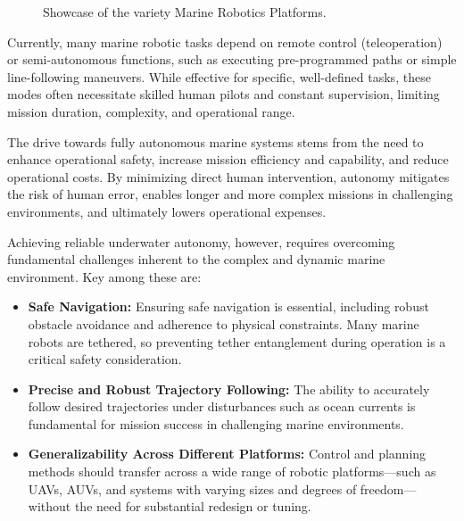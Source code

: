 \begin{figure}[!h]
    \caption{Showcase of the variety Marine Robotics Platforms.}
    \label{fig:underwater_robotics_applications}
\end{figure}


Currently, many marine robotic tasks depend on remote control (teleoperation) or semi-autonomous functions, such as executing pre-programmed paths or simple line-following maneuvers. While effective for specific, well-defined tasks, these modes often necessitate skilled human pilots and constant supervision, limiting mission duration, complexity, and operational range.

The drive towards fully autonomous marine systems stems from the need to enhance operational safety, increase mission efficiency and capability, and reduce operational costs. By minimizing direct human intervention, autonomy mitigates the risk of human error, enables longer and more complex missions in challenging environments, and ultimately lowers operational expenses.


Achieving reliable underwater autonomy, however, requires overcoming fundamental challenges inherent to the complex and dynamic marine environment. Key among these are:

\begin{itemize}
    \item \textbf{Safe Navigation:} Ensuring safe navigation is essential, including robust obstacle avoidance and adherence to physical constraints. Many marine robots are tethered, so preventing tether entanglement during operation is a critical safety consideration.

    \item \textbf{Precise and Robust Trajectory Following:} The ability to accurately follow desired trajectories under disturbances such as ocean currents is fundamental for mission success in challenging marine environments.

    \item \textbf{Generalizability Across Different Platforms:} Control and planning methods should transfer across a wide range of robotic platforms—such as UAVs, AUVs, and systems with varying sizes and degrees of freedom—without the need for substantial redesign or tuning.
\end{itemize}


















